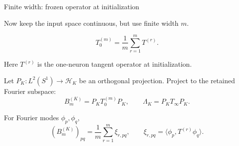 \documentclass[10pt,aspectratio=169]{beamer}
\begin{document}
\begin{frame}{Finite width: frozen operator at initialization}

	Now keep the input space continuous, but use finite width \(m\).

	\[
		T_0^{(m)}
		=
		\frac1m
		\sum_{r=1}^{m}
		T^{(r)} .
	\]

	Here \(T^{(r)}\) is the one-neuron tangent operator at initialization.

	\pause
	Let \(P_K: L^2(S^1) \to \mathcal H_K\) be an orthogonal projection.
	Project to the retained Fourier subspace:
	\[
		B_m^{(K)}
		=
		P_KT_0^{(m)}P_K,
		\qquad
		\Lambda_K
		=
		P_KT_\infty P_K .
	\]

	\pause
	For Fourier modes \(\phi_p,\phi_q\),
	\[
		(B_m^{(K)})_{pq}
		=
		\frac1m
		\sum_{r=1}^{m}
		\xi_{r,pq},
		\qquad
		\xi_{r,pq}
		=
		\langle \phi_p,T^{(r)}\phi_q\rangle .
	\]


\end{frame}
\end{document}
